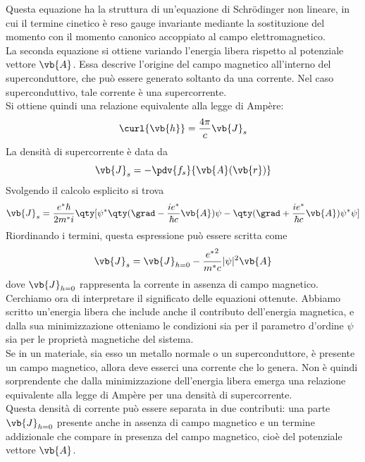 Questa equazione ha la struttura di un'equazione di Schrödinger non lineare, in cui il termine cinetico è reso gauge invariante mediante la sostituzione del momento con il momento canonico accoppiato al campo elettromagnetico.\\
La seconda equazione si ottiene variando l'energia libera rispetto al potenziale vettore $\vb{A}$. Essa descrive l'origine del campo magnetico all'interno del superconduttore, che può essere generato soltanto da una corrente. Nel caso superconduttivo, tale corrente è una supercorrente.\\
Si ottiene quindi una relazione equivalente alla legge di Ampère:
\begin{equation*}
   \curl{\vb{h}}
   = \frac{4\pi}{c} \vb{J}_s
\end{equation*}
La densità di supercorrente è data da
\begin{equation*}
   \vb{J}_s
   = - \pdv{f_s}{\vb{A}(\vb{r})}
\end{equation*}
Svolgendo il calcolo esplicito si trova
\begin{equation*}
   \vb{J}_s
   = \frac{e^*\hbar}{2m^* i}
   \qty[
   \psi^* \qty( \grad - \frac{ie^*}{\hbar c}\vb{A} ) \psi
   - \qty( \grad + \frac{ie^*}{\hbar c}\vb{A} ) \psi^* \psi
   ]
\end{equation*}
Riordinando i termini, questa espressione può essere scritta come
\begin{equation*}
   \vb{J}_s
   = \vb{J}_{h=0}
   - \frac{{e^*}^2}{m^* c} |\psi|^2 \vb{A}
\end{equation*}
dove $\vb{J}_{h=0}$ rappresenta la corrente in assenza di campo magnetico.\\
Cerchiamo ora di interpretare il significato delle equazioni ottenute. Abbiamo scritto un'energia libera che include anche il contributo dell'energia magnetica, e dalla sua minimizzazione otteniamo le condizioni sia per il parametro d'ordine $\psi$ sia per le proprietà magnetiche del sistema.\\
Se in un materiale, sia esso un metallo normale o un superconduttore, è presente un campo magnetico, allora deve esserci una corrente che lo genera. Non è quindi sorprendente che dalla minimizzazione dell'energia libera emerga una relazione equivalente alla legge di Ampère per una densità di supercorrente.\\
Questa densità di corrente può essere separata in due contributi: una parte $\vb{J}_{h=0}$ presente anche in assenza di campo magnetico e un termine addizionale che compare in presenza del campo magnetico, cioè del potenziale vettore $\vb{A}$.\\
